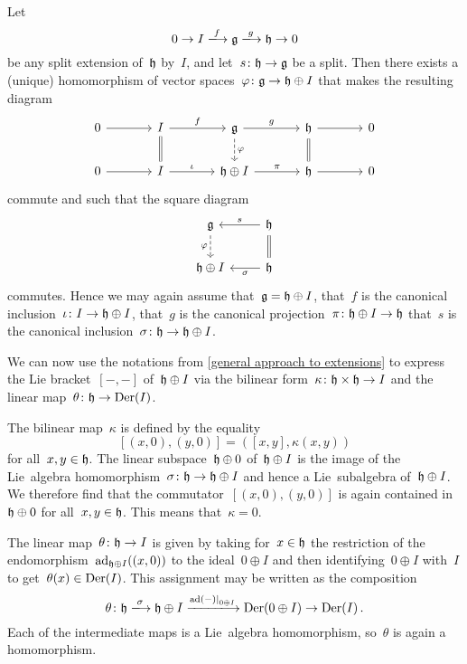 \begin{example}
  Let
  \[
    0
    \to
    I
    \xlongto{f}
    \glie
    \xlongto{g}
    \hlie
    \to
    0
  \]
  be any split extension of~$\mathfrak{h}$ by~$I$, and let~$s \colon \mathfrak{h} \to \mathfrak{g}$ be a split.
  Then there exists a (unique) homomorphism of vector spaces~$\varphi \colon \mathfrak{g} \to \mathfrak{h} \oplus I$ that makes the resulting diagram
  \[
    \begin{tikzcd}[column sep = large]
      0
      \arrow{r}
      &
      I
      \arrow{r}[above]{f}
      \arrow[equal]{d}
      &
      \glie
      \arrow{r}[above]{g}
      \arrow[dashed]{d}[right]{\varphi}
      &
      \hlie
      \arrow{r}
      \arrow[equal]{d}
      &
      0
      \\
      0
      \arrow{r}
      &
      I
      \arrow{r}[above]{\iota}
      &
      \hlie \oplus I
      \arrow{r}[above]{\pi}
      &
      \hlie
      \arrow{r}
      &
      0
    \end{tikzcd}
  \]
  commute and such that the square diagram
  \[
    \begin{tikzcd}
      \glie
      \arrow[dashed]{d}[left]{\varphi}
      &
      \hlie
      \arrow{l}[above]{s}
      \arrow[equal]{d}
      \\
      \hlie \oplus I
      &
      \hlie
      \arrow{l}{\sigma}
    \end{tikzcd}
  \]
  commutes.
  Hence we may again assume that~$\mathfrak{g} = \mathfrak{h} \oplus I$, that~$f$ is the canonical inclusion~$\iota \colon I \to \mathfrak{h} \oplus I$, that~$g$ is the canonical projection~$\pi \colon \mathfrak{h} \oplus I \to \mathfrak{h}$ that~$s$ is the canonical inclusion~$\sigma \colon \mathfrak{h} \to \mathfrak{h} \oplus I$.
  
  We can now use the notations from \cref{general approach to extensions} to express the Lie bracket~$[-,-]$ of~$\mathfrak{h} \oplus I$ via the bilinear form~$\kappa \colon \mathfrak{h} \times \mathfrak{h} \to I$ and the linear map~$\theta \colon \mathfrak{h} \to \operatorname{Der}(I)$.
  
  The bilinear map~$\kappa$ is defined by the equality
  \[
    [(x,0), (y,0)]
    =
    ([x,y], \kappa(x,y))
  \]
  for all~$x, y \in \mathfrak{h}$.
  The linear subspace~$\mathfrak{h} \oplus 0$ of~$\mathfrak{h} \oplus I$ is the image of the Lie~algebra homomorphism~$\sigma \colon \mathfrak{h} \to \mathfrak{h} \oplus I$ and hence a Lie~subalgebra of~$\mathfrak{h} \oplus I$.
  We therefore find that the commutator~$[(x,0), (y,0)]$ is again contained in~$\mathfrak{h} \oplus 0$ for all~$x, y \in \mathfrak{h}$.
  This means that~$\kappa = 0$.
  
  The linear map~$\theta \colon \mathfrak{h} \to I$ is given by taking for~$x \in \mathfrak{h}$ the restriction of the endomorphism~$\operatorname{ad}_{\mathfrak{h} \oplus I}((x,0))$ to the ideal~$0 \oplus I$ and then identifying~$0 \oplus I$ with~$I$ to get~$\theta(x) \in \operatorname{Der}(I)$.
  This assignment may be written as the composition
  \[
    \theta
    \colon
    \hlie
    \xlongto{\sigma}
    \hlie \oplus I
    \xlongto{ \restrict{\ad(-)}{0 \oplus I} }
    \Der(0 \oplus I)
    \to
    \Der(I) \,.
  \]
  Each of the intermediate maps is a Lie~algebra homomorphism, so~$\theta$ is again a homomorphism.
  

\end{example}
